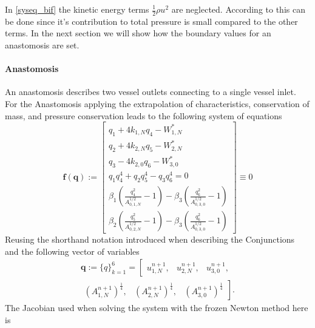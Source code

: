 \documentclass[a4paper, oneside]{discothesis}
\begin{document}
							In \ref{syseq_bif} the kinetic energy terms $\frac{1}{2} \rho u^2$ are neglected.
							According to \cite{Formaggia2003OnedimensionalMF} this can be done since it's contribution to total pressure is small compared to the other terms.
							In the next section we will show how the boundary values for an anastomosis are set.

							\paragraph{Anastomosis} \label{par:anastomosis}
							An anastomosis describes two vessel outlets connecting to a single vessel inlet.
							For the Anastomosis applying the extrapolation of characteristics, conservation of mass, and pressure conservation leads to the following system of equations
							\begin{equation}
								\mathbf{f}(\mathbf{q}):=\left[\begin{array}{c}
										q_{1}+4 k_{1,N} q_{4}-W_{1,N}^* \\
										q_{2}+4 k_{2,N} q_{5}-W_{2,N}^* \\
										q_{3}-4 k_{2,0} q_{6}-W_{3,0}^* \\
										q_{1} q_{4}^4+q_{2} q_{5}^4-q_{3} q_{6}^4=0 \\
										\beta_1\left(\frac{q_{4}^2}{A_{0,1,N}^{1 / 2}}-1\right)-\beta_3\left(\frac{q_{6}^2}{A_{0,3,0}^{1 / 2}}-1\right) \\
										\beta_2\left(\frac{q_{5}^2}{A_{0,2,N}^{1 / 2}}-1\right)-\beta_3\left(\frac{q_{6}^2}{A_{0,3,0}^{1 / 2}}-1\right)
								\end{array}\right] \equiv 0
							\end{equation}
							Reusing the shorthand notation introduced when describing the Conjunctions and the following vector of variables
							\begin{multline}
								\mathbf{q}:=\{q\}_{k=1}^6=\left[
									\begin{array}{lll}
										u_{1,N}^{n+1}, & u_{2,N}^{n+1}, & u_{3,0}^{n+1}, 
								\end{array} \right. \\
								\left. \begin{array}{lll}
										\left(A_{1,N}^{n+1}\right)^{\frac{1}{4}}, & \left(A_{2,N}^{n+1}\right)^{\frac{1}{4}}, & \left(A_{3,0}^{n+1}\right)^{\frac{1}{4}}
								\end{array} \right].
							\end{multline}
							The Jacobian used when solving the system with the frozen Newton method here is
\end{document}

